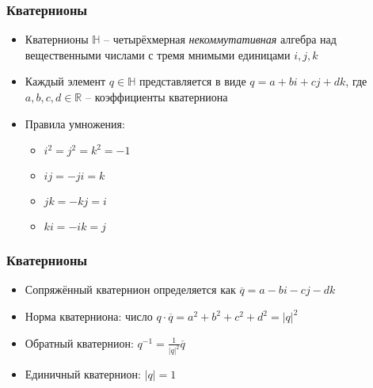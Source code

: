 \documentclass{beamer}
\begin{document}
\begin{frame}[fragile]
\frametitle{Кватернионы}
\begin{itemize}
\item Кватернионы \begin{math}\mathbb H\end{math} -- четырёхмерная \textit{некоммутативная} алгебра над вещественными числами с тремя мнимыми единицами \begin{math}i, j, k\end{math}
\item Каждый элемент \begin{math}q\in \mathbb H\end{math} представляется в виде \begin{math}q = a + bi + cj + dk\end{math}, где \begin{math}a, b, c, d \in \mathbb R\end{math} -- коэффициенты кватерниона
\pause
\item Правила умножения:
\begin{itemize}
\item \begin{math}i^2=j^2=k^2=-1\end{math}
\item \begin{math}ij=-ji=k\end{math}
\item \begin{math}jk=-kj=i\end{math}
\item \begin{math}ki=-ik=j\end{math}
\end{itemize}
\end{itemize}
\end{frame}

\begin{frame}[fragile]
\frametitle{Кватернионы}
\begin{itemize}
\item Сопряжённый кватернион определяется как \begin{math}\overline q = a - bi - cj - dk\end{math}
\item Норма кватерниона: число \begin{math}q \cdot \overline q = a^2 + b^2 + c^2 + d^2 = |q|^2\end{math}
\item Обратный кватернион: \begin{math}q^{-1} = \frac{1}{|q|^2} \overline q\end{math}
\item Единичный кватернион: \begin{math}|q| = 1\end{math}
\end{itemize}
\end{frame}
\end{document}
